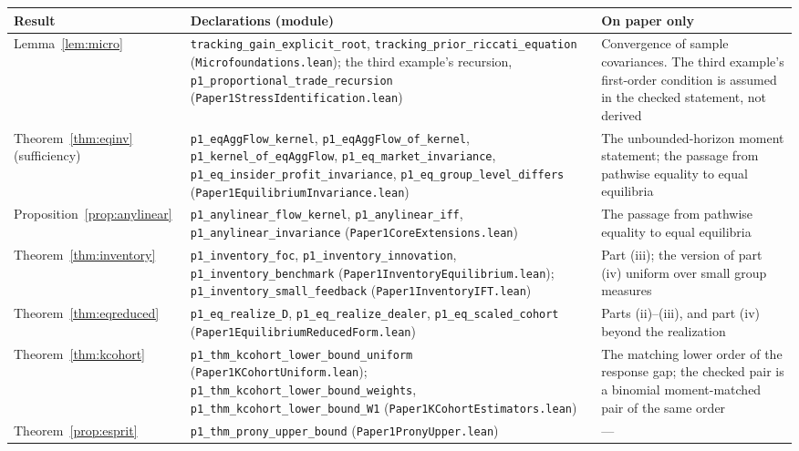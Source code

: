 \begin{longtable}{>{\raggedright\arraybackslash}p{}>{\raggedright\arraybackslash}p{}>{\raggedright\arraybackslash}p{}}
\toprule
Result & Declarations (module) & On paper only\\
\midrule
\endhead
Lemma~\ref{lem:micro} & \texttt{tracking\_gain\_explicit\_root}, \texttt{tracking\_prior\_riccati\_equation} (\nolinkurl{Microfoundations.lean}); the third example's recursion, \texttt{p1\_proportional\_trade\_recursion} (\nolinkurl{Paper1StressIdentification.lean}) & Convergence of sample covariances. The third example's first-order condition is assumed in the checked statement, not derived\\
Theorem~\ref{thm:eqinv} (sufficiency) & \texttt{p1\_eqAggFlow\_kernel}, \texttt{p1\_eqAggFlow\_of\_kernel}, \texttt{p1\_kernel\_of\_eqAggFlow}, \texttt{p1\_eq\_market\_invariance}, \texttt{p1\_eq\_insider\_profit\_invariance}, \texttt{p1\_eq\_group\_level\_differs} (\nolinkurl{Paper1EquilibriumInvariance.lean}) & The unbounded-horizon moment statement; the passage from pathwise equality to equal equilibria\\
Proposition~\ref{prop:anylinear} & \texttt{p1\_anylinear\_flow\_kernel}, \texttt{p1\_anylinear\_iff}, \texttt{p1\_anylinear\_invariance} (\nolinkurl{Paper1CoreExtensions.lean}) & The passage from pathwise equality to equal equilibria\\
Theorem~\ref{thm:inventory} & \texttt{p1\_inventory\_foc}, \texttt{p1\_inventory\_innovation}, \texttt{p1\_inventory\_benchmark} (\nolinkurl{Paper1InventoryEquilibrium.lean}); \texttt{p1\_inventory\_small\_feedback} (\nolinkurl{Paper1InventoryIFT.lean}) & Part (iii); the version of part (iv) uniform over small group measures\\
Theorem~\ref{thm:eqreduced} & \texttt{p1\_eq\_realize\_D}, \texttt{p1\_eq\_realize\_dealer}, \texttt{p1\_eq\_scaled\_cohort} (\nolinkurl{Paper1EquilibriumReducedForm.lean}) & Parts (ii)--(iii), and part (iv) beyond the realization\\
Theorem~\ref{thm:kcohort} & \texttt{p1\_thm\_kcohort\_lower\_bound\_uniform} (\nolinkurl{Paper1KCohortUniform.lean}); \texttt{p1\_thm\_kcohort\_lower\_bound\_weights}, \texttt{p1\_thm\_kcohort\_lower\_bound\_W1} (\nolinkurl{Paper1KCohortEstimators.lean}) & The matching lower order of the response gap; the checked pair is a binomial moment-matched pair of the same order\\
Theorem~\ref{prop:esprit} & \texttt{p1\_thm\_prony\_upper\_bound} (\nolinkurl{Paper1PronyUpper.lean}) & ---\\

\end{longtable}
